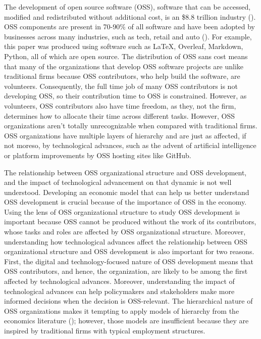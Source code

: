 \documentclass[12pt,notitlepage]{article}
\begin{document}
The development of open source software (OSS), software that can be accessed, modified and redistributed without additional cost, is an \$8.8 trillion industry (\cite{hoffmann_value_2024}). OSS components are present in 70-90\% of all software and have been adopted by businesses across many industries, such as tech, retail and auto (\cite{nagle_open_2017}). For example, this paper was produced using software such as LaTeX, Overleaf, Markdown, Python, all of which are open source. The distribution of OSS sans cost means that many of the organizations that develop OSS software projects are unlike traditional firms because OSS contributors, who help build the software, are volunteers. Consequently, the full time job of many OSS contributors is not developing OSS, so their contribution time to OSS is constrained. However, as volunteers, OSS contributors also have time freedom, as they, not the firm, determines how to allocate their time across different tasks. However, OSS organizations aren't totally unrecognizable when compared with traditional firms. OSS organizations have multiple layers of hierarchy and are just as affected, if not moreso, by technological advances, such as the advent of artificial intelligence or platform improvements by OSS hosting sites like GitHub.

\qquad The relationship between OSS organizational structure and OSS development, and the impact of technological advancement on that dynamic is not well understood. Developing an economic model that can help us better understand OSS development is crucial because of the importance of OSS in the economy. Using the lens of OSS organizational structure to study OSS development is important because OSS cannot be produced without the work of its contributors, whose tasks and roles are affected by OSS organizational structure. Moreover, understanding how technological advances affect the relationship between OSS organizational structure and OSS development is also important for two reasons. First, the digital and technology-focused nature of OSS development means that OSS contributors, and hence, the organization, are likely to be among the first affected by technological advances. Moreover, understanding the impact of technological advances can help policymakers and stakeholders make more informed decisions when the decision is OSS-relevant. The hierarchical nature of OSS organizations makes it tempting to apply models of hierarchy from the economics literature (\cite{garicano_hierarchies_2000}); however, those models are insufficient because they are inspired by traditional firms with typical employment structures. 
\end{document}
